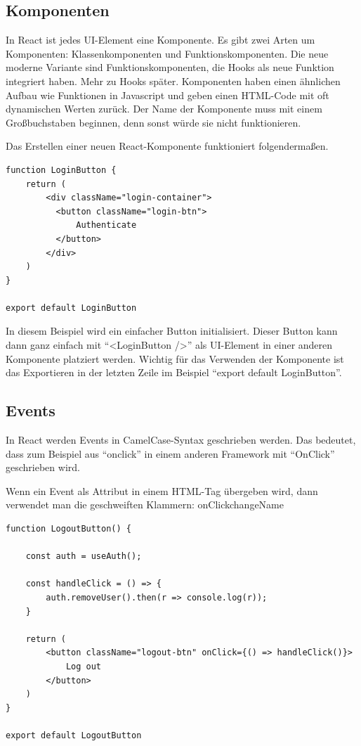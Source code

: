 \subsection*{Komponenten}
In React ist jedes UI-Element eine Komponente. Es gibt zwei Arten um Komponenten: Klassenkomponenten und Funktionskomponenten. Die neue moderne Variante 
sind Funktionskomponenten, die Hooks als neue Funktion integriert haben. Mehr zu Hooks später.
Komponenten haben einen ähnlichen Aufbau wie Funktionen in Javascript und geben einen HTML-Code mit oft dynamischen Werten zurück.
Der Name der Komponente muss mit einem Großbuchstaben beginnen, denn sonst würde sie nicht funktionieren.

Das Erstellen einer neuen React-Komponente funktioniert folgendermaßen.

\begin{lstlisting}[caption=Komponente in React]
  function LoginButton {
    return (
        <div className="login-container">
          <button className="login-btn">
              Authenticate
          </button>
        </div>
    )
}

export default LoginButton
\end{lstlisting}

In diesem Beispiel wird ein einfacher Button initialisiert. Dieser Button kann dann ganz einfach mit ``<LoginButton />''
als UI-Element in einer anderen Komponente platziert werden. Wichtig für das Verwenden der Komponente ist das Exportieren 
in der letzten Zeile im Beispiel ``export default LoginButton''.

\subsection*{Events}
In React werden Events in CamelCase-Syntax geschrieben werden. Das bedeutet, dass zum Beispiel aus ``onclick'' in 
einem anderen Framework mit ``OnClick'' geschrieben wird. 

Wenn ein Event als Attribut in einem HTML-Tag übergeben wird, dann verwendet man die geschweiften Klammern: onClick{changeName}

\begin{lstlisting}[caption=React Event]
  function LogoutButton() {

    const auth = useAuth();

    const handleClick = () => {
        auth.removeUser().then(r => console.log(r));
    }

    return (
        <button className="logout-btn" onClick={() => handleClick()}>
            Log out
        </button>
    )
}

export default LogoutButton
\end{lstlisting}

